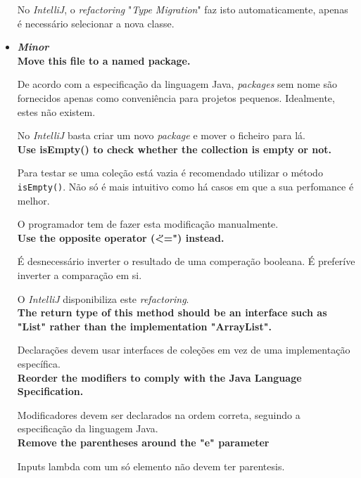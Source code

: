 \documentclass[a4paper]{report}
\begin{document}
\begin{itemize}
    No \textit{IntelliJ}, o \textit{refactoring} "\textit{Type Migration}" faz isto automaticamente, apenas é necessário selecionar a nova classe.\\
    
    
    \item \textit{\textbf{Minor}}\\
    \textbf{Move this file to a named package.}
    
    De acordo com a especificação da linguagem Java, \textit{packages} sem nome são fornecidos apenas como conveniência para projetos pequenos. Idealmente, estes não existem.
    
    No \textit{IntelliJ} basta criar um novo \textit{package} e mover o ficheiro para lá.\\
    
    \textbf{Use isEmpty() to check whether the collection is empty or not.}
    
    Para testar se uma coleção está vazia é recomendado utilizar o método \texttt{isEmpty()}. Não só é mais intuitivo como há casos em que a sua perfomance é melhor.
    
    O programador tem de fazer esta modificação manualmente.\\
    
    \textbf{Use the opposite operator (\"<=") instead.}
    
    É desnecessário inverter o resultado de uma comperação booleana. É preferíve inverter a comparação em si.
    
    O \textit{IntelliJ} disponibiliza este \textit{refactoring}.\\
    
    \textbf{The return type of this method should be an interface such as "List" rather than the implementation "ArrayList".}
    
    Declarações devem usar interfaces de coleções em vez de uma implementação específica.\\
    
    \textbf{Reorder the modifiers to comply with the Java Language Specification.}
    
    Modificadores devem ser declarados na ordem correta, seguindo a especificação da linguagem Java.\\
    
    \textbf{Remove the parentheses around the "e" parameter}
    
    Inputs lambda com um só elemento não devem ter parentesis.\\
\end{itemize}
\end{document}
